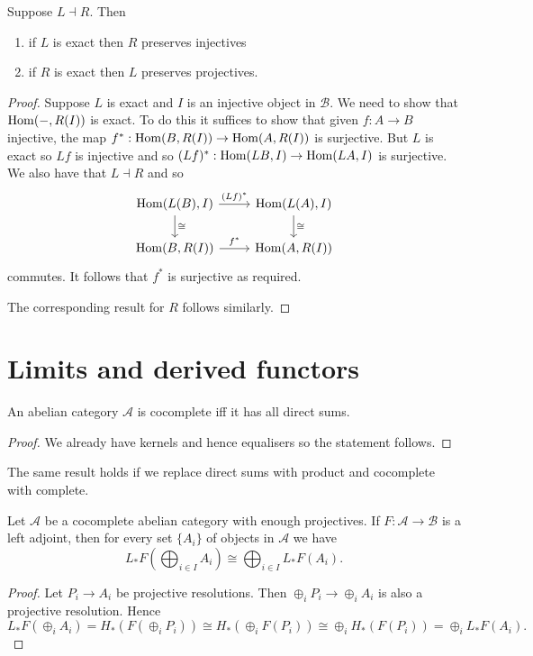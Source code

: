 \documentclass{memoir}
\begin{document}
\begin{proposition}
    Suppose $L\dashv R$. Then
    \begin{enumerate}
        \item if $L$ is exact then $R$ preserves injectives
        \item if $R$ is exact then $L$ preserves projectives.
    \end{enumerate}
\end{proposition}
\begin{proof}
    Suppose $L$ is exact and $I$ is an injective object in $\mathcal B$.
    We need to show that $\operatorname{Hom}(-,R(I))$ is exact.
    To do this it suffices to show that given $f:A\to B$ injective, the map $f^*:\operatorname{Hom}(B,R(I))\to\operatorname{Hom}(A,R(I))$ is surjective.
    But $L$ is exact so $Lf$ is injective and so $(Lf)^*:\operatorname{Hom}(LB,I)\to\operatorname{Hom}(LA,I)$ is surjective.
    We also have that $L\dashv R$ and so 
    \begin{equation}
        \begin{tikzcd}
            \Hom(L(B),I) \arrow[d,"\cong"] \arrow[r,"(Lf)^*"] & \Hom(L(A),I) \arrow[d,"\cong"] \\
            \Hom(B,R(I)) \arrow[r,"f^*"] & \Hom(A,R(I))
        \end{tikzcd}
    \end{equation}
    commutes.
    It follows that $f^*$ is surjective as required.

    The corresponding result for $R$ follows similarly.
\end{proof}
\section{Limits and derived functors}
\begin{proposition}
    An abelian category $\mathcal A$ is cocomplete iff it has all direct sums.
\end{proposition}
\begin{proof}
    We already have kernels and hence equalisers so the statement follows.
\end{proof}
\begin{remark}
    The same result holds if we replace direct sums with product and cocomplete with complete.
\end{remark}
\begin{thm}
    Let $\mathcal A$ be a cocomplete abelian category with enough projectives.
    If $F:\mathcal A \to \mathcal B$ is a left adjoint, then for every set $\{A_i\}$ of objects in $\mathcal A$ we have
    \begin{equation}
        L_*F\left(\bigoplus_{i\in I}A_i\right) \cong \bigoplus_{i\in I} L_*F(A_i).
    \end{equation}
\end{thm}
\begin{proof}
    Let $P_i\to A_i$ be projective resolutions.
    Then $\oplus_iP_i\to \oplus_iA_i$ is also a projective resolution.
    Hence
    \begin{equation}
        L_*F(\oplus_iA_i) = H_*(F(\oplus_iP_i)) \cong H_*(\oplus_iF(P_i)) \cong \oplus_iH_*(F(P_i)) = \oplus_iL_*F(A_i).
    \end{equation}
\end{proof}
\end{document}
